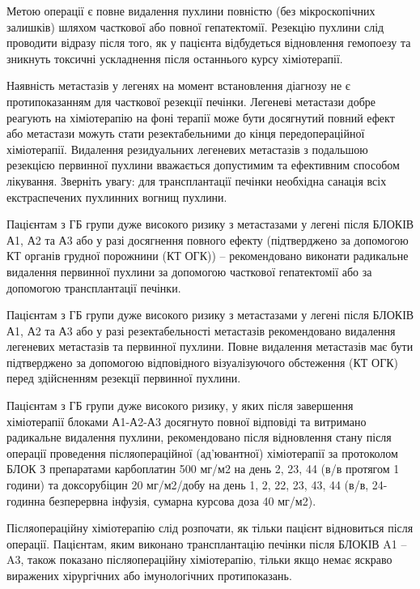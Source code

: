 Метою операції є повне видалення пухлини повністю (без мікроскопічних залишків) шляхом часткової або повної гепатектомії. Резекцію пухлини слід проводити відразу після того, як у пацієнта відбудеться відновлення гемопоезу та зникнуть токсичні ускладнення після останнього курсу хіміотерапії\cite{pmid9494762}. 

Наявність метастазів у легенях на момент встановлення діагнозу не є протипоказанням для часткової резекції печінки\cite{pmid18975296}. Легеневі метастази добре реагують на хіміотерапію на фоні терапії може бути досягнутий повний ефект або метастази можуть стати резектабельними до кінця передопераційної хіміотерапії. Видалення резидуальних легеневих метастазів з подальшою резекцією первинної пухлини вважається допустимим та ефективним способом лікування. Зверніть увагу: для трансплантації печінки необхідна санація всіх екстраспечених пухлинних вогнищ пухлини\cite{pmid8749932}.

Пацієнтам з ГБ групи дуже високого ризику з метастазами у легені після БЛОКІВ А1, А2 та А3 або у разі досягнення повного ефекту (підтверджено за допомогою КТ органів грудної порожнини (КТ ОГК)) 
– рекомендовано виконати радикальне видалення первинної пухлини за допомогою часткової гепатектомії або за допомогою трансплантації печінки\cite{pmid15862752}\cite{pmid24362406}.

Пацієнтам з ГБ групи дуже високого ризику з метастазами у легені після БЛОКІВ А1, А2 та А3 або у разі резектабельності метастазів рекомендовано видалення легеневих метастазів та первинної пухлини. Повне видалення метастазів має бути підтверджено за допомогою відповідного візуалізуючого обстеження (КТ ОГК) перед здійсненням резекції первинної пухлини\cite{pmid16045186}.

Пацієнтам з ГБ групи дуже високого ризику, у яких після завершення хіміотерапії блоками А1-А2-А3 досягнуто повної відповіді та витримано радикальне видалення пухлини, рекомендовано після відновлення стану після операції проведення післяопераційної (ад'ювантної) хіміотерапії за протоколом БЛОК З препаратами карбоплатин 500 мг/м2 на день 2, 23, 44 (в/в протягом 1 години) та доксорубіцин 20 мг/м2/добу на день 1, 2, 22, 23, 43, 44 (в/в, 24-годинна безперервна інфузія, сумарна курсова доза 40 мг/м2)\cite{pmid29761829}.

Післяопераційну хіміотерапію слід розпочати, як тільки пацієнт відновиться після операції. Пацієнтам, яким виконано трансплантацію печінки після БЛОКІВ A1 – A3, також показано післяопераційну хіміотерапію, тільки якщо немає яскраво виражених хірургічних або імунологічних протипоказань\cite{pmid27910913}.

